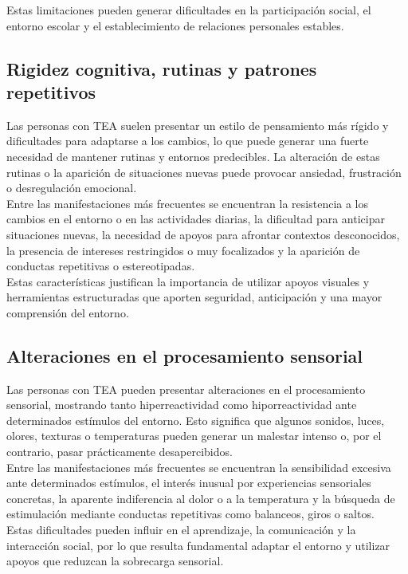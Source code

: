\documentclass{article}
\begin{document}
Estas limitaciones pueden generar dificultades en la participación social, el entorno escolar y el establecimiento de relaciones personales estables. 

\subsection{\textbf{Rigidez cognitiva, rutinas y patrones repetitivos}}
Las personas con TEA suelen presentar un estilo de pensamiento más rígido y dificultades para adaptarse a los cambios, lo que puede generar una fuerte necesidad de mantener rutinas y entornos predecibles. La alteración de estas rutinas o la aparición de situaciones nuevas puede provocar ansiedad, frustración o desregulación emocional.\\

Entre las manifestaciones más frecuentes se encuentran la resistencia a los cambios en el entorno o en las actividades diarias, la dificultad para anticipar situaciones nuevas, la necesidad de apoyos para afrontar contextos desconocidos, la presencia de intereses restringidos o muy focalizados y la aparición de conductas repetitivas o estereotipadas.\\

Estas características justifican la importancia de utilizar apoyos visuales y herramientas estructuradas que aporten seguridad, anticipación y una mayor comprensión del entorno. 

\subsection{\textbf{Alteraciones en el procesamiento sensorial}}
Las personas con TEA pueden presentar alteraciones en el procesamiento sensorial, mostrando tanto hiperreactividad como hiporreactividad ante determinados estímulos del entorno. Esto significa que algunos sonidos, luces, olores, texturas o temperaturas pueden generar un malestar intenso o, por el contrario, pasar prácticamente desapercibidos.\\

Entre las manifestaciones más frecuentes se encuentran la sensibilidad excesiva ante determinados estímulos, el interés inusual por experiencias sensoriales concretas, la aparente indiferencia al dolor o a la temperatura y la búsqueda de estimulación mediante conductas repetitivas como balanceos, giros o saltos.\\

Estas dificultades pueden influir en el aprendizaje, la comunicación y la interacción social, por lo que resulta fundamental adaptar el entorno y utilizar apoyos que reduzcan la sobrecarga sensorial.
\end{document}
